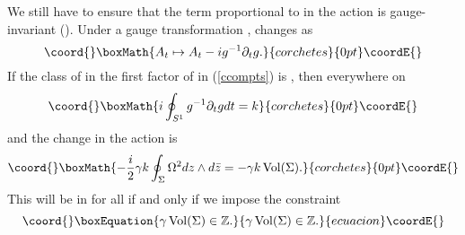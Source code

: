 \documentclass[a4paper,11pt]{article}
\begin{document}
We still have to ensure that the term proportional to \coordHE{} in the
action is gauge-invariant (\coordHE{}). Under a gauge
transformation \coordHE{}, \coordHE{} changes as
\[\coord{}\boxMath{
A_{t} \mapsto
A_{t} -i g^{-1}\partial_{t}g.
}{corchetes}{0pt}\coordE{}\]
If the class of \coordHE{} in the first factor of \coordHE{}
in (\ref{ccompts}) is \coordHE{}, then everywhere on \myHighlight{$\Sigma$}\coordHE{}
\[\coord{}\boxMath{
i\oint_{S^{1}} g^{-1} \partial_{t}g dt=k 
}{corchetes}{0pt}\coordE{}\]
and the change in the action is
\[\coord{}\boxMath{
-\frac{i}{2}
\gamma k \oint_{\Sigma}\Omega^{2}dz\wedge d\bar{z}=-\gamma k\, 
{\rm Vol}(\Sigma).
}{corchetes}{0pt}\coordE{}\]
This will be in \coordHE{}
for all \coordHE{} if and only if we impose the constraint
\begin{equation}\coord{}\boxEquation{\label{gamma}
\gamma \,{\rm Vol}(\Sigma) \in \mathbb{Z}.
}{\gamma \,{\rm Vol}(\Sigma) \in \mathbb{Z}.
}{ecuacion}\coordE{}\end{equation}
\end{document}
